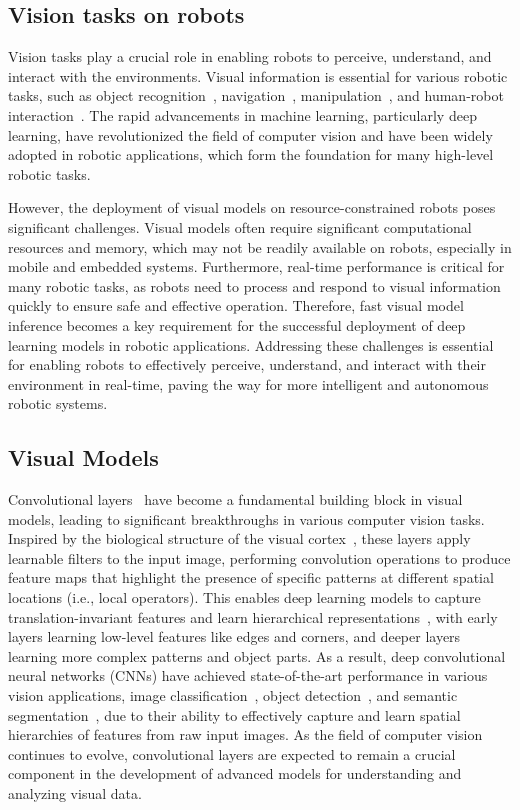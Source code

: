 \subsection{Vision tasks on robots}
Vision tasks play a crucial role in enabling robots to perceive, understand, and interact with the environments. 
Visual information is essential for various robotic tasks, such as object recognition~\cite{galvez2018object}, navigation~\cite{ran2017convolutional}, manipulation~\cite{bayar2018constrained}, and human-robot interaction~\cite{wu2019weight}. 
The rapid advancements in machine learning, particularly deep learning, have revolutionized the field of computer vision and have been widely adopted in robotic applications, which form the foundation for many high-level robotic tasks.

However, the deployment of visual models on resource-constrained robots poses significant challenges. 
Visual models often require significant computational resources and memory, which may not be readily available on robots, especially in mobile and embedded systems. 
Furthermore, real-time performance is critical for many robotic tasks, as robots need to process and respond to visual information quickly to ensure safe and effective operation. 
Therefore, fast visual model inference becomes a key requirement for the successful deployment of deep learning models in robotic applications.
Addressing these challenges is essential for enabling robots to effectively perceive, understand, and interact with their environment in real-time, paving the way for more intelligent and autonomous robotic systems.


\subsection{Visual Models}
Convolutional layers~\cite{o2015introduction} have become a fundamental building block in visual models, leading to significant breakthroughs in various computer vision tasks. 
Inspired by the biological structure of the visual cortex~\cite{tripp2019approximating}, these layers apply learnable filters to the input image, performing convolution operations to produce feature maps that highlight the presence of specific patterns at different spatial locations (i.e., local operators). 
This enables deep learning models to capture translation-invariant features and learn hierarchical representations~\cite{ma2015hierarchical}, with early layers learning low-level features like edges and corners, and deeper layers learning more complex patterns and object parts. 
As a result, deep convolutional neural networks (CNNs) have achieved state-of-the-art performance in various vision applications, image classification~\cite{rawat2017deep}, object detection~\cite{galvez2018object}, and semantic segmentation~\cite{wang2018understanding}, due to their ability to effectively capture and learn spatial hierarchies of features from raw input images. 
As the field of computer vision continues to evolve, convolutional layers are expected to remain a crucial component in the development of advanced models for understanding and analyzing visual data.

